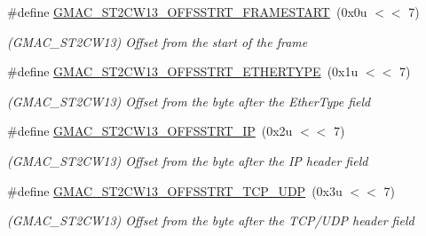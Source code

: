 \begin{DoxyCompactItemize}
\item 
\mbox{\label{group__SAME70__GMAC_gafc44a7401067be036541c4e7549fdf05}} 
\#define \mbox{\hyperlink{group__SAME70__GMAC_gafc44a7401067be036541c4e7549fdf05}{G\+M\+A\+C\+\_\+\+S\+T2\+C\+W13\+\_\+\+O\+F\+F\+S\+S\+T\+R\+T\+\_\+\+F\+R\+A\+M\+E\+S\+T\+A\+RT}}~(0x0u $<$$<$ 7)
\begin{DoxyCompactList}\small\item\em (G\+M\+A\+C\+\_\+\+S\+T2\+C\+W13) Offset from the start of the frame \end{DoxyCompactList}\item 
\mbox{\label{group__SAME70__GMAC_gab6ee73298820965f3331f47aa7432cab}} 
\#define \mbox{\hyperlink{group__SAME70__GMAC_gab6ee73298820965f3331f47aa7432cab}{G\+M\+A\+C\+\_\+\+S\+T2\+C\+W13\+\_\+\+O\+F\+F\+S\+S\+T\+R\+T\+\_\+\+E\+T\+H\+E\+R\+T\+Y\+PE}}~(0x1u $<$$<$ 7)
\begin{DoxyCompactList}\small\item\em (G\+M\+A\+C\+\_\+\+S\+T2\+C\+W13) Offset from the byte after the Ether\+Type field \end{DoxyCompactList}\item 
\mbox{\label{group__SAME70__GMAC_gaa825c8362a8d863f032e26f6b0157c77}} 
\#define \mbox{\hyperlink{group__SAME70__GMAC_gaa825c8362a8d863f032e26f6b0157c77}{G\+M\+A\+C\+\_\+\+S\+T2\+C\+W13\+\_\+\+O\+F\+F\+S\+S\+T\+R\+T\+\_\+\+IP}}~(0x2u $<$$<$ 7)
\begin{DoxyCompactList}\small\item\em (G\+M\+A\+C\+\_\+\+S\+T2\+C\+W13) Offset from the byte after the IP header field \end{DoxyCompactList}\item 
\mbox{\label{group__SAME70__GMAC_gad6e915af3f9b558846d6e4d4531a4db7}} 
\#define \mbox{\hyperlink{group__SAME70__GMAC_gad6e915af3f9b558846d6e4d4531a4db7}{G\+M\+A\+C\+\_\+\+S\+T2\+C\+W13\+\_\+\+O\+F\+F\+S\+S\+T\+R\+T\+\_\+\+T\+C\+P\+\_\+\+U\+DP}}~(0x3u $<$$<$ 7)
\begin{DoxyCompactList}\small\item\em (G\+M\+A\+C\+\_\+\+S\+T2\+C\+W13) Offset from the byte after the T\+C\+P/\+U\+DP header field \end{DoxyCompactList}\item 
\mbox{\label{group__SAME70__GMAC_ga46394ab46ee07c863cbca88efebf0354}} 

\end{DoxyCompactItemize}
